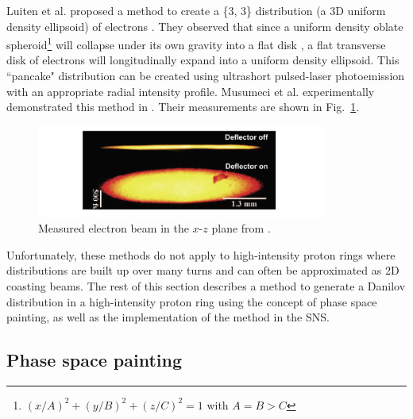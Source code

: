 Luiten et al. proposed a method to create a \{3, 3\} distribution (a 3D uniform density ellipsoid) of electrons \cite{Luiten2004}. They observed that since a uniform density oblate spheroid\footnote{$(x/A)^2 + (y/B)^2 + (z/C)^2 = 1$ with $A = B > C$} will collapse under its own gravity into a flat disk \cite{Lin1965}, a flat transverse disk of electrons will longitudinally expand into a uniform density ellipsoid. This ``pancake" distribution can be created using ultrashort pulsed-laser photoemission with an appropriate radial intensity profile. Musumeci et al. experimentally demonstrated this method in \cite{Musumeci2008}. Their measurements are shown in Fig.~\ref{fig:Musumeci}.
%
\begin{figure}[!p]
    \centering
    \includegraphics[width=0.85\textwidth]{Images/chapter1/Musumeci_fig2.png}
    \caption{Measured electron beam in the $x$-$z$ plane from \cite{Musumeci2008}.}
    \label{fig:Musumeci}
\end{figure}
%

Unfortunately, these methods do not apply to high-intensity proton rings where distributions are built up over many turns and can often be approximated as 2D coasting beams. The rest of this section describes a method to generate a Danilov distribution in a high-intensity proton ring using the concept of phase space painting, as well as the implementation of the method in the SNS.


\subsection{Phase space painting}

